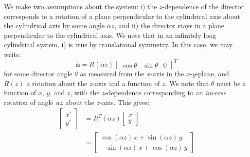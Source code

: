\documentclass[reqno]{article}
\newcommand{\n}{\hat{\mathbf{n}}}
\begin{document}
We make two assumptions about the system: i) the $z$-dependence of the director corresponds to a rotation of a plane perpendicular to the cylindrical axis about the cylindrical axis by some angle $\alpha z$, and ii) the director stays in a plane perpendicular to the cylindrical axis.
We note that in an infinitely long cylindrical system, i) is true by translational symmetry.
In this case, we may write:
\begin{equation}
    \n
    =
    R(\alpha z)
    \begin{bmatrix}
        \cos\theta &\sin\theta &0
    \end{bmatrix}^T
\end{equation}
for some director angle $\theta$ as measured from the $x$-axis in the $x$-$y$-plane, and $R(z)$ a rotation about the $z$-axis and a function of $z$.
We note that $\theta$ must be a function of $x$, $y$, and $z$, with the $z$-dependence corresponding to an \textit{inverse} rotation of angle $\alpha z$ about the $z$-axis. 
This gives:
\begin{equation}
\begin{split}
    \begin{bmatrix}
        x' \\
        y'
    \end{bmatrix}
    &=
    R^T(\alpha z)
    \begin{bmatrix}
        x \\
        y
    \end{bmatrix} \\
    &=
    \begin{bmatrix}
        \cos (\alpha z) \, x + \sin(\alpha z) \, y \\
        -\sin(\alpha z) \, x + \cos(\alpha z) \, y
    \end{bmatrix}
\end{split}
\end{equation}
\end{document}
